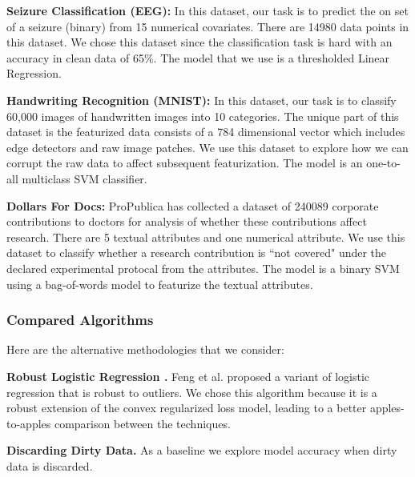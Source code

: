 \noindent\textbf{Seizure Classification (EEG): } In this dataset, our task is to predict the on set of a seizure (binary) from 15 numerical covariates. There are 14980 data points in this dataset. We chose this dataset since the classification task is hard with an accuracy in clean data of 65\%. The model that we use is a thresholded Linear Regression.

\vspace{0.5em}

\noindent\textbf{Handwriting Recognition (MNIST): } In this dataset, our task is to classify 60,000 images of handwritten images into 10 categories. The unique part of this dataset is the featurized data consists of a 784 dimensional vector which includes edge detectors and raw image patches. We use this dataset to explore how we can corrupt the raw data to affect subsequent featurization. The model is an one-to-all multiclass SVM classifier. 

\vspace{0.5em}

\noindent\textbf{Dollars For Docs: } ProPublica has collected a dataset of 240089 corporate contributions to doctors for analysis of whether these contributions affect research. 
There are 5 textual attributes and one numerical attribute.
We use this dataset to classify whether a research contribution is ``not covered" under the declared experimental protocal from the attributes.
The model is a binary SVM using a bag-of-words model to featurize the textual attributes.

\subsubsection{Compared Algorithms}
\noindent Here are the alternative methodologies that we consider:

\vspace{0.5em}

\noindent\textbf{Robust Logistic Regression \cite{feng2014robust}. } Feng et al. proposed a variant of logistic regression that is robust to outliers. We chose this algorithm because it is a robust extension of the convex regularized loss model, leading to a better apples-to-apples comparison between the techniques.  

\vspace{0.5em}

\noindent\textbf{Discarding Dirty Data. } As a baseline we explore model accuracy when dirty data is discarded.

